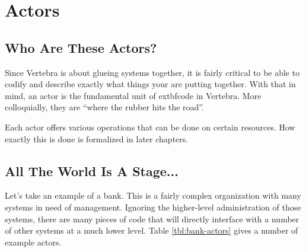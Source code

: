 \newcommand{\actor}{{\sf actor}}
\newcommand{\actors}{{\sf actors}}
\newcommand{\Actor}{{\sf Actor}}
\newcommand{\Actors}{{\sf Actors}}

\section{Actors}

\subsection{Who Are These Actors?}

Since Vertebra is about glueing systems together, it is fairly critical to be able to codify and describe exactly what things your are putting together.  With that in mind, an \actor{} is the fundamental unit of         extbf{code} in Vertebra.  More colloquially, they are ``where the rubber hits the road''.

Each \actor{} offers various operations that can be done on certain resources.  How exactly this is done is formalized in later chapters.

\subsection{All The World Is A Stage...}

Let's take an example of a bank.  This is a fairly complex organization with many systems in need of management.  Ignoring the higher-level administration of those systems, there are many pieces of code that will directly interface with a number of other systems at a much lower level.  Table \ref{tbl:bank-actors} gives a number of example actors.

